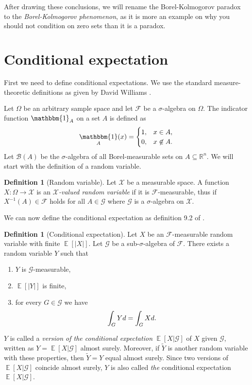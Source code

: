 \documentclass[a4paper]{report}
\theoremstyle{plain}
\theoremstyle{definition}
\newtheorem{definition}[theorem]{Definition}
\theoremstyle{remark}
\numberwithin{equation}{chapter}
\newcommand{\R}{\mathbb{R}}
\let\P\relax
\DeclareMathOperator{\P}{\mathbb{P}}
\DeclareMathOperator{\E}{\mathbb{E}}
\DeclareMathOperator{\1}{\mathbbm{1}}
\newcommand{\F}{\mathcal{F}}
\renewcommand{\G}{\mathcal{G}}
\newcommand{\B}{\mathcal{B}}
\newcommand{\X}{\mathcal{X}}
\begin{document}
After drawing these conclusions, we will rename the Borel-Kolmogorov paradox to the \emph{Borel-Kolmogorov phenomenon}, as it is more an example on why you should not condition on zero sets than it is a paradox.

\section{Conditional expectation}
First we need to define conditional expectations. We use the standard measure-theoretic definitions as given by David Williams \cite{Williams91}.

Let $\Omega$ be an arbitrary sample space and let $\mathcal{F}$ be a $\sigma$-algebra on $\Omega$. The indicator function $\1_A$ on a set $A$ is defined as
\begin{equation}
\1_A(x)=\begin{cases}1,&x\in A,\\0,&x\not\in A.\end{cases}
\end{equation}
Let $\B(A)$ be the $\sigma$-algebra of all Borel-measurable sets on $A\subseteq\R^n$. We will start with the definition of a random variable.

\begin{definition}[Random variable]
Let $\X$ be a measurable space. A function $X\colon\Omega\to\X$ is an \emph{$\X$-valued random variable} if it is $\F$-measurable, thus if $X^{-1}(A)\in\F$ holds for all $A\in\G$ where $\G$ is a $\sigma$-algebra on $\X$.
\end{definition}

We can now define the conditional expectation as definition 9.2 of \cite{Williams91}.

\begin{definition}[Conditional expectation]\label{def:conexp}
Let $X$ be an $\F$-measurable random variable with finite $\E[|X|]$. Let $\G$ be a sub-$\sigma$-algebra of $\F$. There exists a random variable $Y$ such that 
\begin{enumerate}
\item $Y$ is $\G$-measurable,
\item $\E[|Y|]$ is finite,
\item for every $G\in\G$ we have 
\begin{equation}
\int_G Yd\P=\int_G Xd\P.
\end{equation}
\end{enumerate}
$Y$ is called a \emph{version of the conditional expectation} $\E[X|\G]$ of $X$ given $\G$, written as $Y=\E[X|\G]$ almost surely. Moreover, if $\tilde{Y}$ is another random variable with these properties, then $\tilde{Y}=Y$ equal almost surely. Since two versions of $\E[X|\G]$ coincide almost surely, $Y$ is also called \emph{the} conditional expectation $\E[X|\G]$.
\end{definition}
\end{document}
